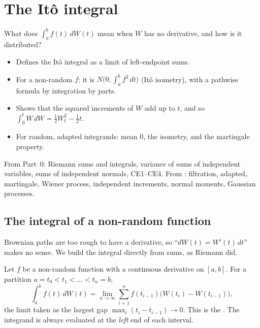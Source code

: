 \chapter{The Itô integral}
\label{ch:ito-integral}

\begin{question}
What does $\int_a^b f(t)\,dW(t)$ mean when $W$ has no derivative, and how is it distributed?
\end{question}

\begin{whatfor}
\begin{itemize}
  \item Defines the Itô integral as a limit of left-endpoint sums.
  \item For a non-random $f$: it is $N\big(0,\int_a^bf^2\,dt\big)$ (Itô isometry), with a pathwise formula by integration by parts.
  \item Shows that the squared increments of $W$ add up to $t$, and so $\int_0^tW\,dW=\frac12W_t^2-\frac12t$.
  \item For random, adapted integrands: mean $0$, the isometry, and the martingale property.
\end{itemize}
\end{whatfor}

\begin{prereq}
From Part~0: Riemann sums and integrals, variance of sums of independent variables, sums of independent normals, CE1--CE4. From : filtration, adapted, martingale, Wiener process, independent increments, normal moments, Gaussian processes.
\end{prereq}

\section{The integral of a non-random function}

Brownian paths are too rough to have a derivative, so ``$dW(t)=W'(t)\,dt$'' makes no sense. We build the integral directly from sums, as Riemann did.

\begin{definition}
\label{def:ito-det}
Let $f$ be a non-random function with a continuous derivative on $[a,b]$. For a partition $a=t_0<t_1<\dots<t_n=b$,
\[
  \int_a^bf(t)\,dW(t)=\lim_{n\to\infty}\sum_{i=1}^nf(t_{i-1})\big(W(t_i)-W(t_{i-1})\big),
\]
the limit taken as the largest gap $\max_i(t_i-t_{i-1})\to0$. This is the . The integrand is always evaluated at the \emph{left} end of each interval.
\end{definition}

